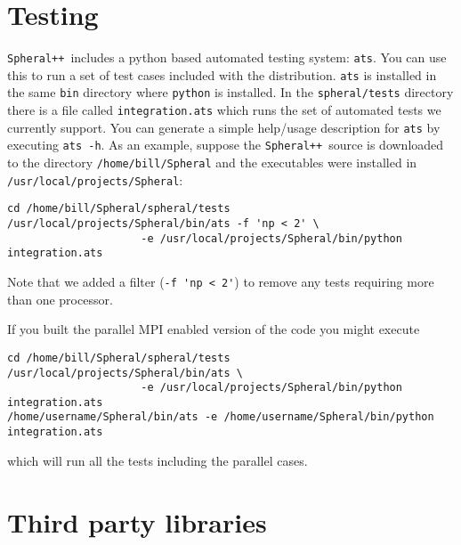 \documentclass{article}
\newcommand{\Spheral}{{\tt Spheral++}}
\begin{document}
\section{Testing}
\Spheral\ includes a python based automated testing system: \verb+ats+.  You can use this to run a set of test cases included with the distribution.  \verb+ats+ is installed in the same \verb+bin+ directory where \verb+python+ is installed.  In the \verb+spheral/tests+ directory there is a file called \verb+integration.ats+ which runs the set of automated tests we currently support.  You can generate a simple help/usage description for {\tt ats} by executing \verb+ats -h+.  As an example, suppose the \Spheral\ source is downloaded to the directory \verb./home/bill/Spheral. and the executables were installed in \verb./usr/local/projects/Spheral.:
\begin{verbatim}
cd /home/bill/Spheral/spheral/tests
/usr/local/projects/Spheral/bin/ats -f 'np < 2' \
                     -e /usr/local/projects/Spheral/bin/python integration.ats
\end{verbatim}
Note that we added a filter (\verb+-f 'np < 2'+) to remove any tests requiring more than one processor.

If you built the parallel MPI enabled version of the code you might execute
\begin{verbatim}
cd /home/bill/Spheral/spheral/tests
/usr/local/projects/Spheral/bin/ats \
                     -e /usr/local/projects/Spheral/bin/python integration.ats
/home/username/Spheral/bin/ats -e /home/username/Spheral/bin/python integration.ats
\end{verbatim}
which will run all the tests including the parallel cases.

\appendix
\section{Third party libraries}
\label{thirdParty.sec}
\end{document}
